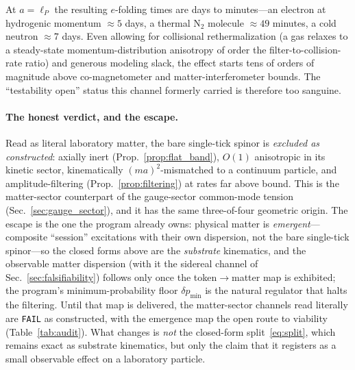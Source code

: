 At $a=\ell_P$ the resulting $e$-folding times are days to minutes---an electron at
hydrogenic momentum $\approx5$ days, a thermal $\mathrm{N}_2$ molecule
$\approx49$ minutes, a cold neutron $\approx7$ days. Even allowing for collisional
rethermalization (a gas relaxes to a steady-state momentum-distribution anisotropy
of order the filter-to-collision-rate ratio) and generous modeling slack, the effect
starts tens of orders of magnitude above co-magnetometer and matter-interferometer
bounds. The ``testability open'' status this channel formerly carried is therefore
too sanguine.

\paragraph{The honest verdict, and the escape.} Read as literal laboratory matter,
the bare single-tick spinor is \emph{excluded as constructed}: axially inert
(Prop.~\ref{prop:flat_band}), $O(1)$ anisotropic in its kinetic sector, kinematically
$(ma)^2$-mismatched to a continuum particle, and amplitude-filtering
(Prop.~\ref{prop:filtering}) at rates far above bound. This is the matter-sector
counterpart of the gauge-sector common-mode tension (Sec.~\ref{sec:gauge_sector}),
and it has the same three-of-four geometric origin. The escape is the one the program
already owns: physical matter is \emph{emergent}---composite ``session'' excitations
with their own dispersion, not the bare single-tick spinor---so the closed forms above
are the \emph{substrate} kinematics, and the observable matter dispersion (with it the
sidereal channel of Sec.~\ref{sec:falsifiability}) follows only once the
token$\to$matter map is exhibited; the program's minimum-probability floor
$\delta p_\text{min}$ is the natural regulator that halts the filtering. Until that map
is delivered, the matter-sector channels read literally are \texttt{FAIL} as
constructed, with the emergence map the open route to viability
(Table~\ref{tab:audit}). What changes is \emph{not} the closed-form
split~\eqref{eq:split}, which remains exact as substrate kinematics, but only the
claim that it registers as a small observable effect on a laboratory particle.

